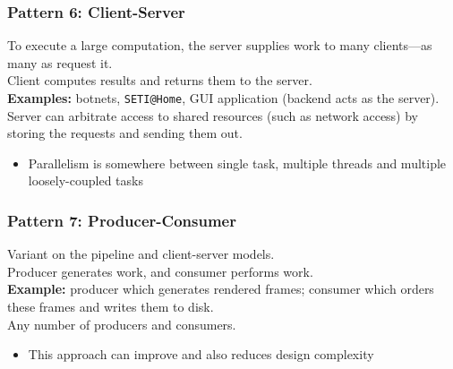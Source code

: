 \documentclass[aspectratio=43]{beamer}
\newenvironment{changemargin}[1]{%
  \begin{list}{}{%
    \setlength{\topsep}{0pt}%
    \setlength{\leftmargin}{#1}%
    \setlength{\rightmargin}{1em}
    \setlength{\listparindent}{\parindent}%
    \setlength{\itemindent}{\parindent}%
    \setlength{\parsep}{\parskip}%
  }%
  \item[]}{\end{list}}
\begin{document}
\begin{frame}
  \frametitle{Pattern 6: Client-Server}

  \begin{changemargin}{2.5cm}
    To execute a large computation, the server supplies work to many
      clients---as many as request it.\\[1em]

    Client computes results and returns them to the server.\\[1em]
   {\bf Examples:} botnets, {\tt SETI@Home}, GUI application (backend
      acts as the server).\\[1em]
   Server can arbitrate access to shared resources (such as network
      access) by storing the requests and sending them out.\\[1em]

   \begin{itemize}
    \item Parallelism is somewhere between single task, multiple threads and
      multiple loosely-coupled tasks  
  \end{itemize}
  \end{changemargin}
\end{frame}

\begin{frame}
  \frametitle{Pattern 7: Producer-Consumer}

  \begin{changemargin}{2.5cm}
    Variant on the pipeline and client-server models.\\
    Producer generates work, and consumer performs work.\\[1em]
    {\bf Example:} producer which generates rendered frames;
      consumer which orders these frames and writes them to disk.\\[1em]
    Any number of producers and consumers.\\[1em]

    \begin{itemize}
    \item This approach can improve  and also reduces
      design complexity
    \end{itemize}
  \end{changemargin}
\end{frame}
\end{document}
